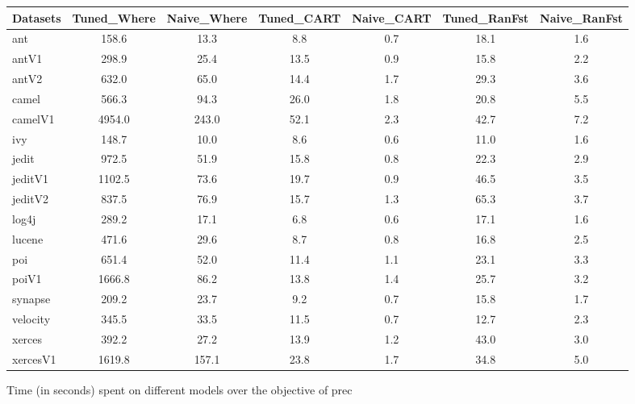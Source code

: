 \begin{figure*}[!ht]
\scriptsize
\centering
  \begin{tabular}{l|c |c |c |c |c |c }
    \hline\hline
    Datasets & Tuned\_Where & Naive\_Where & Tuned\_CART & Naive\_CART & Tuned\_RanFst & Naive\_RanFst\\
    \hline
    ant & 158.6 & 13.3 & 8.8 & 0.7 & 18.1 & 1.6\\
    antV1 & 298.9 & 25.4 & 13.5 & 0.9 & 15.8 & 2.2\\
    antV2 & 632.0 & 65.0 & 14.4 & 1.7 & 29.3 & 3.6\\
    camel & 566.3 & 94.3 & 26.0 & 1.8 & 20.8 & 5.5\\
    camelV1 & 4954.0 & 243.0 & 52.1 & 2.3 & 42.7 & 7.2\\
    ivy & 148.7 & 10.0 & 8.6 & 0.6 & 11.0 & 1.6\\
    jedit & 972.5 & 51.9 & 15.8 & 0.8 & 22.3 & 2.9\\
    jeditV1 & 1102.5 & 73.6 & 19.7 & 0.9 & 46.5 & 3.5\\
    jeditV2 & 837.5 & 76.9 & 15.7 & 1.3 & 65.3 & 3.7\\
    log4j & 289.2 & 17.1 & 6.8 & 0.6 & 17.1 & 1.6\\
    lucene & 471.6 & 29.6 & 8.7 & 0.8 & 16.8 & 2.5\\
    poi & 651.4 & 52.0 & 11.4 & 1.1 & 23.1 & 3.3\\
    poiV1 & 1666.8 & 86.2 & 13.8 & 1.4 & 25.7 & 3.2\\
    synapse & 209.2 & 23.7 & 9.2 & 0.7 & 15.8 & 1.7\\
    velocity & 345.5 & 33.5 & 11.5 & 0.7 & 12.7 & 2.3\\
    xerces & 392.2 & 27.2 & 13.9 & 1.2 & 43.0 & 3.0\\
    xercesV1 & 1619.8 & 157.1 & 23.8 & 1.7 & 34.8 & 5.0\\
  \end{tabular}
  \caption{Time (in seconds) spent on different models over the objective of prec}
\end{figure*}


